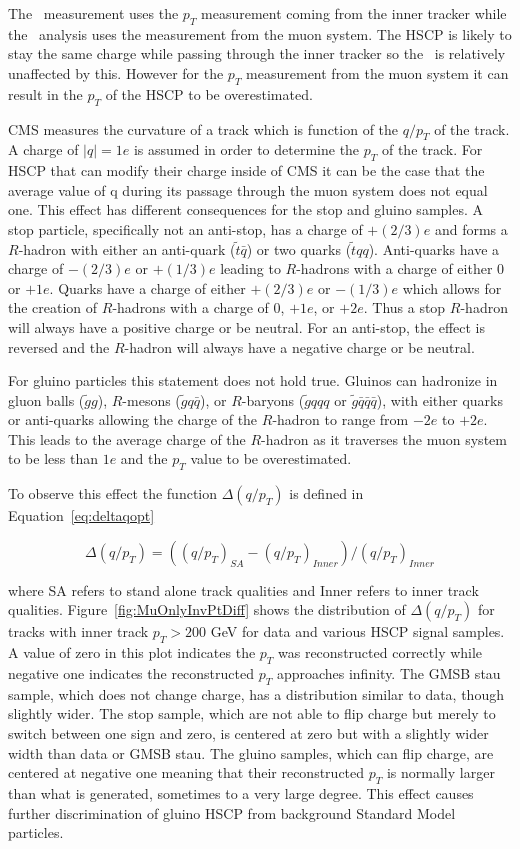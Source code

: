 The \tktof\ measurement uses the $p_T$ measurement coming from the inner tracker while the \muononly\ analysis uses the measurement from the muon system.
The HSCP is likely to stay the same charge while
passing through the inner tracker so the \tktof\ is relatively unaffected by this. However for the $p_T$ measurement from the muon system it can result in the $p_T$ of the
HSCP to be overestimated.

CMS measures the curvature of a track which is function of the $q/p_T$ of the track. A charge of $|q|=1e$ is assumed in order to determine the $p_T$ of the track.
For HSCP that can modify their charge inside of CMS it can be the case that the average value of q during its passage through the muon system does not equal one.
This effect has different consequences for the stop and gluino samples. A stop particle,
specifically not an anti-stop, has a charge of $+(2/3)e$ and forms a $R$-hadron with either an anti-quark ($\tilde{t} \bar{q}$) or
two quarks  ($\tilde{t} q q$). Anti-quarks have a charge of $-(2/3)e$ or $+(1/3)e$ leading to $R$-hadrons with a charge
of either 0 or $+1e$. Quarks have a charge of either $+(2/3)e$ or $-(1/3)e$ which allows for
the creation of $R$-hadrons with a charge of 0, $+1e$, or $+2e$. Thus a stop $R$-hadron will always have a
positive charge or be neutral. For an anti-stop, the effect is reversed and the $R$-hadron will always have a
negative charge or be neutral.

For gluino particles this statement does not hold true. Gluinos can hadronize in gluon balls ($\tilde{g}g$), $R$-mesons ($\tilde{g} q \bar{q}$), or
$R$-baryons ($\tilde{g} qqq$ or $\tilde{g} \bar{q}\bar{q}\bar{q}$), with either quarks or
anti-quarks allowing the charge of the $R$-hadron to range from $-2e$ to $+2e$. This leads to the
average charge of the $R$-hadron as it traverses the muon system to be less than $1e$ and the $p_T$
value to be overestimated.

To observe this effect the function
$\Delta(q/p_T)$ is defined in Equation~\ref{eq:deltaqopt}

\begin{equation}
\Delta(q/p_T) = ((q/p_T)_{SA} - (q/p_T)_{Inner})/(q/p_T)_{Inner}
\label{eq:deltaqopt}
\end{equation}

where SA refers to stand alone track qualities and Inner refers to
inner track qualities.
Figure~\ref{fig:MuOnlyInvPtDiff} shows the distribution of
$\Delta(q/p_T)$ for tracks with inner track $p_T > 200$ GeV
for data and various HSCP signal samples.
A value of zero in this plot indicates the $p_T$ was reconstructed correctly
while negative one indicates the reconstructed $p_T$ approaches infinity.
The GMSB stau sample, which does not change charge,
has a distribution similar to data, though slightly wider.
The stop sample, which are not able to flip charge but merely to switch
between one sign and zero, is centered at zero but with a slightly wider
width than data or GMSB stau.
The gluino samples, which can flip charge, are centered at negative one meaning that
their reconstructed $p_T$ is normally larger than what is generated, sometimes
to a very large degree.  This effect causes further discrimination of gluino HSCP
from background Standard Model particles.

